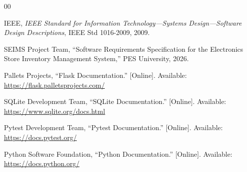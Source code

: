 \documentclass[conference]{IEEEtran}
\begin{document}
\begin{thebibliography}{00}

IEEE, \emph{IEEE Standard for Information Technology---Systems Design---Software Design Descriptions}, IEEE Std 1016-2009, 2009.

SEIMS Project Team, ``Software Requirements Specification for the Electronics Store Inventory Management System,'' PES University, 2026.

Pallets Projects, ``Flask Documentation.'' [Online]. Available:
\url{https://flask.palletsprojects.com/}

SQLite Development Team, ``SQLite Documentation.'' [Online]. Available:
\url{https://www.sqlite.org/docs.html}

Pytest Development Team, ``Pytest Documentation.'' [Online]. Available:
\url{https://docs.pytest.org/}

Python Software Foundation, ``Python Documentation.'' [Online]. Available:
\url{https://docs.python.org/}

\end{thebibliography}

\balance
\end{document}
